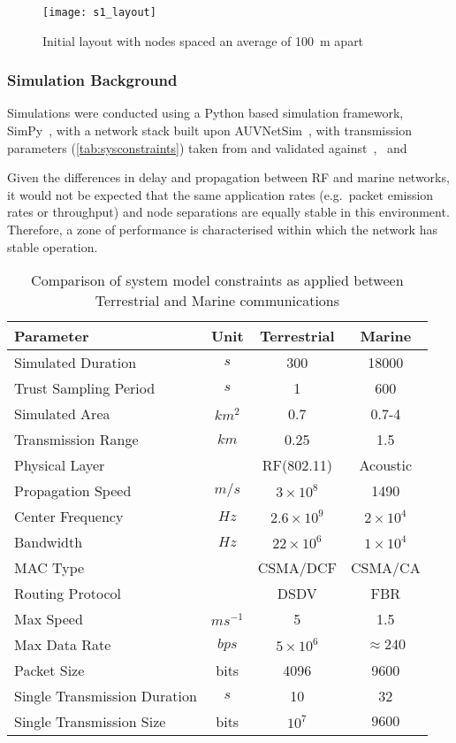 %
\begin{figure}[h]
	\centering
	\texttt{[image: s1\_layout]}
	\caption{Initial layout with nodes spaced an average of \SI{100}{\meter} apart}
	\label{fig:s1_layout}
\end{figure}
%

\subsubsection{Simulation Background}

Simulations were conducted using a Python based simulation framework, SimPy~\cite{Mueller2003SimPy}, with a network stack built upon AUVNetSim~\cite{Miquel2008}, with transmission parameters (\autoref{tab:sysconstraints}) taken from and validated against~\cite{Stojanovic2007},~\cite{Stefanov2011} and~\cite{Sehgal2010}

Given the differences in delay and propagation between RF and marine networks, it would not be expected that the same application rates (e.g.\ packet emission rates or throughput) and node separations are equally stable in this environment.
Therefore, a zone of performance is characterised within which the network has stable operation.
%
\begin{table}[h]
	\caption{Comparison of system model constraints as applied between Terrestrial and Marine communications} \label{tab:sysconstraints}
	\begin{center}
		\setlength{\tabcolsep}{8pt}
		\begin{tabular}{lccc}
			\toprule
			Parameter & Unit & Terrestrial & Marine \\
			\midrule
			Simulated Duration & $s$ & 300 & 18000\\
			Trust Sampling Period & $s$ & 1 & 600 \\
			Simulated Area & $km^2$ & 0.7 & 0.7-4 \\
			Transmission Range & $km$ & 0.25 & 1.5 \\
			Physical Layer & & RF(802.11) & Acoustic\\
			Propagation Speed& $m/s$ & $3\times10^8$ & 1490\\
			Center Frequency& $Hz$ & $2.6\times10^9$ & $2 \times 10^4$ \\
			Bandwidth& $Hz$ & $22\times10^6$ & $1\times10^4$\\
			MAC Type & & CSMA/DCF & CSMA/CA\\
			Routing Protocol & & DSDV & FBR \\
			Max Speed & $ms^{-1}$ & 5 & 1.5 \\
			Max Data Rate & $bps$ & $5\times10^6$ & $\approx 240$ \\
			Packet Size & bits & 4096 &  9600 \\
			Single Transmission Duration & $s$ & 10 & 32 \\
			Single Transmission Size & bits & $10^7$ & $9600$ \\
			\bottomrule
		\end{tabular}
		\setlength{\tabcolsep}{6pt}
	\end{center}
\end{table}
%


